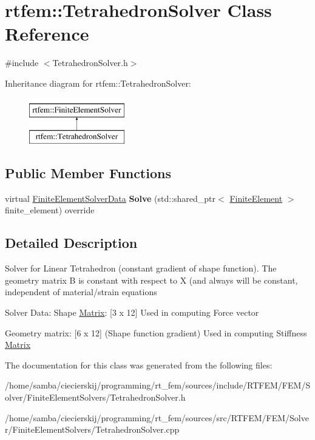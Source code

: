 \hypertarget{classrtfem_1_1TetrahedronSolver}{}\section{rtfem\+:\+:Tetrahedron\+Solver Class Reference}
\label{classrtfem_1_1TetrahedronSolver}


{\ttfamily \#include $<$Tetrahedron\+Solver.\+h$>$}

Inheritance diagram for rtfem\+:\+:Tetrahedron\+Solver\+:\begin{figure}[H]
\begin{center}
\leavevmode
\includegraphics[height=2.000000cm]{classrtfem_1_1TetrahedronSolver}
\end{center}
\end{figure}
\subsection*{Public Member Functions}
\begin{DoxyCompactItemize}
\item 
\mbox{\label{classrtfem_1_1TetrahedronSolver_a8d51da2dea70e926dd0975bc2ce92c52}} 
virtual \hyperlink{structrtfem_1_1FiniteElementSolverData}{Finite\+Element\+Solver\+Data} {\bfseries Solve} (std\+::shared\+\_\+ptr$<$ \hyperlink{classrtfem_1_1FiniteElement}{Finite\+Element} $>$ finite\+\_\+element) override
\end{DoxyCompactItemize}


\subsection{Detailed Description}
Solver for Linear Tetrahedron (constant gradient of shape function). The geometry matrix B is constant with respect to X (and always will be constant, independent of material/strain equations

Solver Data\+: Shape \hyperlink{classrtfem_1_1Matrix}{Matrix}\+: \mbox{[}3 x 12\mbox{]} Used in computing Force vector

Geometry matrix\+: \mbox{[}6 x 12\mbox{]} (Shape function gradient) Used in computing Stiffness \hyperlink{classrtfem_1_1Matrix}{Matrix} 

The documentation for this class was generated from the following files\+:\begin{DoxyCompactItemize}
\item 
/home/samba/ciecierskij/programming/rt\+\_\+fem/sources/include/\+R\+T\+F\+E\+M/\+F\+E\+M/\+Solver/\+Finite\+Element\+Solvers/Tetrahedron\+Solver.\+h\item 
/home/samba/ciecierskij/programming/rt\+\_\+fem/sources/src/\+R\+T\+F\+E\+M/\+F\+E\+M/\+Solver/\+Finite\+Element\+Solvers/Tetrahedron\+Solver.\+cpp\end{DoxyCompactItemize}
